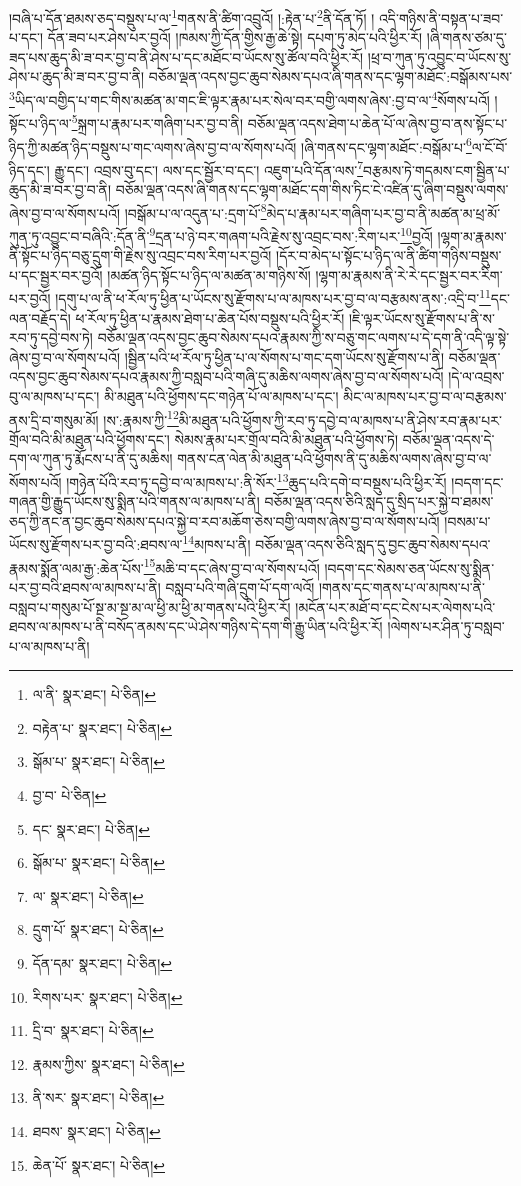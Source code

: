 །བཞི་པ་དོན་ཐམས་ཅད་བསྡུས་པ་ལ་\footnote{ལ་ནི་  སྣར་ཐང་།  པེ་ཅིན། }གནས་ནི་ཚིག་འབྲུའོ། །:རྟེན་པ་\footnote{བརྟེན་པ་  སྣར་ཐང་།  པེ་ཅིན། }ནི་དོན་ཏོ། །
འདི་གཉིས་ནི་བསྟན་པ་ཟབ་པ་དང་། དོན་ཟབ་པར་ཤེས་པར་བྱའོ། །ཁམས་ཀྱི་དོན་གྱིས་རྒྱ་ཆེ་སྟེ། དཔག་ཏུ་མེད་པའི་ཕྱིར་རོ། །ཞི་གནས་ཙམ་དུ་ཟད་པས་ཆུད་མི་ཟ་བར་བྱ་བ་ནི་ཤེས་པ་དང་མཐོང་བ་ཡོངས་སུ་ཚོལ་བའི་ཕྱིར་རོ། །ཕྲ་བ་ཀུན་ཏུ་འབྱུང་བ་ཡོངས་སུ་ཤེས་པ་ཆུད་མི་ཟ་བར་བྱ་བ་ནི། བཅོམ་ལྡན་འདས་བྱང་ཆུབ་སེམས་དཔའ་ཞི་གནས་དང་ལྷག་མཐོང་:བསྒོམས་པས་\footnote{སྒོམ་པ་  སྣར་ཐང་།  པེ་ཅིན། }ཡིད་ལ་བགྱིད་པ་གང་གིས་མཚན་མ་གང་ཇི་ལྟར་རྣམ་པར་སེལ་བར་བགྱི་ལགས་ཞེས་:བྱ་བ་ལ་\footnote{བྱ་བ་  པེ་ཅིན། }སོགས་པའོ། །སྟོང་པ་ཉིད་ལ་\footnote{དང་  སྣར་ཐང་།  པེ་ཅིན། }སྐྲག་པ་རྣམ་པར་གཞིག་པར་བྱ་བ་ནི། བཅོམ་ལྡན་འདས་ཐེག་པ་ཆེན་པོ་ལ་ཞེས་བྱ་བ་ནས་སྟོང་པ་ཉིད་ཀྱི་མཚན་ཉིད་བསྡུས་པ་གང་ལགས་ཞེས་བྱ་བ་ལ་སོགས་པའོ། །ཞི་གནས་དང་ལྷག་མཐོང་:བསྒོམ་པ་\footnote{སྒོམ་པ་  སྣར་ཐང་།  པེ་ཅིན། }ལ་ངོ་བོ་ཉིད་དང་། རྒྱུ་དང་། འབྲས་བུ་དང་། ལས་དང་སྦྱོར་བ་དང་། འཇུག་པའི་དོན་ལས་\footnote{ལ་  སྣར་ཐང་།  པེ་ཅིན། }བརྩམས་ཏེ་གདམས་ངག་སྦྱིན་པ་ཆུད་མི་ཟ་བར་བྱ་བ་ནི། བཅོམ་ལྡན་འདས་ཞི་གནས་དང་ལྷག་མཐོང་དག་གིས་ཏིང་ངེ་འཛིན་དུ་ཞིག་བསྡུས་ལགས་ཞེས་བྱ་བ་ལ་སོགས་པའོ། །བསྒོམ་པ་ལ་འདུན་པ་:དྲག་པོ་\footnote{དྲུག་པོ་  སྣར་ཐང་།  པེ་ཅིན། }མེད་པ་རྣམ་པར་གཞིག་པར་བྱ་བ་ནི་མཚན་མ་ཕྲ་མོ་ཀུན་ཏུ་འབྱུང་བ་བཞིའི་:དོན་ནི་\footnote{དོན་དམ་  སྣར་ཐང་།  པེ་ཅིན། }དྲན་པ་ཉེ་བར་གཞག་པའི་རྗེས་སུ་འབྲང་བས་:རིག་པར་\footnote{རིགས་པར་  སྣར་ཐང་།  པེ་ཅིན། }བྱའོ། །ལྷག་མ་རྣམས་ནི་སྟོང་པ་ཉིད་བཅུ་དྲུག་གི་རྗེས་སུ་འབྲང་བས་རིག་པར་བྱའོ། །དོར་བ་མེད་པ་སྟོང་པ་ཉིད་ལ་ནི་ཚིག་གཉིས་བསྡུས་པ་དང་སྦྱར་བར་བྱའོ། །མཚན་ཉིད་སྟོང་པ་ཉིད་ལ་མཚན་མ་གཉིས་སོ། །ལྷག་མ་རྣམས་ནི་རེ་རེ་དང་སྦྱར་བར་རིག་པར་བྱའོ། །དགུ་པ་ལ་ནི་ཕ་རོལ་ཏུ་ཕྱིན་པ་ཡོངས་སུ་རྫོགས་པ་ལ་མཁས་པར་བྱ་བ་ལ་བརྩམས་ནས་:འདྲི་བ་\footnote{དྲི་བ་  སྣར་ཐང་།  པེ་ཅིན། }དང་ལན་བརྗོད་དེ། ཕ་རོལ་ཏུ་ཕྱིན་པ་རྣམས་ཐེག་པ་ཆེན་པོས་བསྡུས་པའི་ཕྱིར་རོ། །ཇི་ལྟར་ཡོངས་སུ་རྫོགས་པ་ནི་ས་རབ་ཏུ་དབྱེ་བས་ཏེ། བཅོམ་ལྡན་འདས་བྱང་ཆུབ་སེམས་དཔའ་རྣམས་ཀྱི་ས་བཅུ་གང་ལགས་པ་དེ་དག་ནི་འདི་ལྟ་སྟེ་ཞེས་བྱ་བ་ལ་སོགས་པའོ། །སྦྱིན་པའི་ཕ་རོལ་ཏུ་ཕྱིན་པ་ལ་སོགས་པ་གང་དག་ཡོངས་སུ་རྫོགས་པ་ནི། བཅོམ་ལྡན་འདས་བྱང་ཆུབ་སེམས་དཔའ་རྣམས་ཀྱི་བསླབ་པའི་གཞི་དུ་མཆིས་ལགས་ཞེས་བྱ་བ་ལ་སོགས་པའོ། །དེ་ལ་འབྲས་བུ་ལ་མཁས་པ་དང་། མི་མཐུན་པའི་ཕྱོགས་དང་གཉེན་པོ་ལ་མཁས་པ་དང་། མིང་ལ་མཁས་པར་བྱ་བ་ལ་བརྩམས་ནས་དྲི་བ་གསུམ་མོ། །ས་:རྣམས་ཀྱི་\footnote{རྣམས་ཀྱིས་  སྣར་ཐང་།  པེ་ཅིན། }མི་མཐུན་པའི་ཕྱོགས་ཀྱི་རབ་ཏུ་དབྱེ་བ་ལ་མཁས་པ་ནི་ཤེས་རབ་རྣམ་པར་གྲོལ་བའི་མི་མཐུན་པའི་ཕྱོགས་དང་། སེམས་རྣམ་པར་གྲོལ་བའི་མི་མཐུན་པའི་ཕྱོགས་ཏེ། བཅོམ་ལྡན་འདས་དེ་དག་ལ་ཀུན་ཏུ་རྨོངས་པ་ནི་དུ་མཆིས། གནས་ངན་ལེན་མི་མཐུན་པའི་ཕྱོགས་ནི་དུ་མཆིས་ལགས་ཞེས་བྱ་བ་ལ་སོགས་པའོ། །གཉེན་པོའི་རབ་ཏུ་དབྱེ་བ་ལ་མཁས་པ་:ནི་སོར་\footnote{ནི་སར་  སྣར་ཐང་།  པེ་ཅིན། }ཆུད་པའི་དགེ་བ་བསྡུས་པའི་ཕྱིར་རོ། །བདག་དང་གཞན་གྱི་རྒྱུད་ཡོངས་སུ་སྨིན་པའི་གནས་ལ་མཁས་པ་ནི། བཅོམ་ལྡན་འདས་ཅིའི་སླད་དུ་སྲིད་པར་སྐྱེ་བ་ཐམས་ཅད་ཀྱི་ནང་ན་བྱང་ཆུབ་སེམས་དཔའ་སྐྱེ་བ་རབ་མཆོག་ཅེས་བགྱི་ལགས་ཞེས་བྱ་བ་ལ་སོགས་པའོ། །བསམ་པ་ཡོངས་སུ་རྫོགས་པར་བྱ་བའི་:ཐབས་ལ་\footnote{ཐབས་  སྣར་ཐང་།  པེ་ཅིན། }མཁས་པ་ནི། བཅོམ་ལྡན་འདས་ཅིའི་སླད་དུ་བྱང་ཆུབ་སེམས་དཔའ་རྣམས་སྨོན་ལམ་རྒྱ་:ཆེན་པོས་\footnote{ཆེན་པོ་  སྣར་ཐང་།  པེ་ཅིན། }མཆི་བ་དང་ཞེས་བྱ་བ་ལ་སོགས་པའོ། །བདག་དང་སེམས་ཅན་ཡོངས་སུ་སྨིན་པར་བྱ་བའི་ཐབས་ལ་མཁས་པ་ནི། བསླབ་པའི་གཞི་དྲུག་པོ་དག་ལའོ། །གནས་དང་གནས་པ་ལ་མཁས་པ་ནི་བསླབ་པ་གསུམ་པོ་སྔ་མ་སྔ་མ་ལ་ཕྱི་མ་ཕྱི་མ་གནས་པའི་ཕྱིར་རོ། །མངོན་པར་མཐོ་བ་དང་ངེས་པར་ལེགས་པའི་ཐབས་ལ་མཁས་པ་ནི་བསོད་ནམས་དང་ཡེ་ཤེས་གཉིས་དེ་དག་གི་རྒྱུ་ཡིན་པའི་ཕྱིར་རོ། །ལེགས་པར་ཤིན་ཏུ་བསླབ་པ་ལ་མཁས་པ་ནི། 